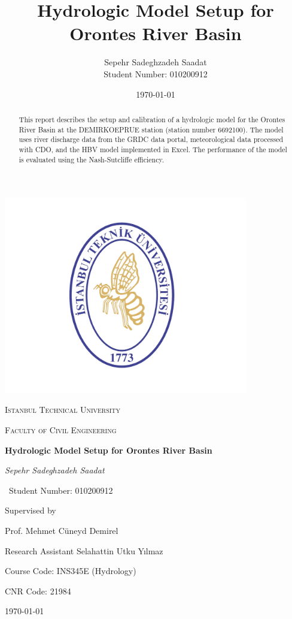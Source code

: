 \documentclass[a4paper, 12pt]{article}
\title{Hydrologic Model Setup for Orontes River Basin}
\author{Sepehr Sadeghzadeh Saadat \\ Student Number: 010200912}
\date{\today}
\begin{document}
\begin{titlepage}
    \centering
    \includegraphics[width=0.8\textwidth]{İstanbul_Teknik_Üniversitesi_Logo.jpg}\par\vspace{1cm}
    {\scshape\LARGE Istanbul Technical University \par}
    \vspace{0.5cm}
    {\scshape\Large Faculty of Civil Engineering \par}
  
    \vspace{1.5cm}
    {\huge\bfseries Hydrologic Model Setup for Orontes River Basin\par}
    \vspace{2cm}
    {\Large\itshape Sepehr Sadeghzadeh Saadat \par}
    {\Large\ Student Number: 010200912 \par}
    \vfill
    Supervised by\par
    Prof. Mehmet Cüneyd Demirel \par
    Research Assistant	Selahattin Utku Yılmaz \par
    \vfill
    Course Code: INS345E (Hydrology) \par
    CNR Code: 21984 \par
    \vfill
    {\large \today\par}
\end{titlepage}

\begin{abstract}
This report describes the setup and calibration of a hydrologic model for the Orontes River Basin at the DEMIRKOEPRUE station (station number 6692100). The model uses river discharge data from the GRDC data portal, meteorological data processed with CDO, and the HBV model implemented in Excel. The performance of the model is evaluated using the Nash-Sutcliffe efficiency.
\end{abstract}
\end{document}
